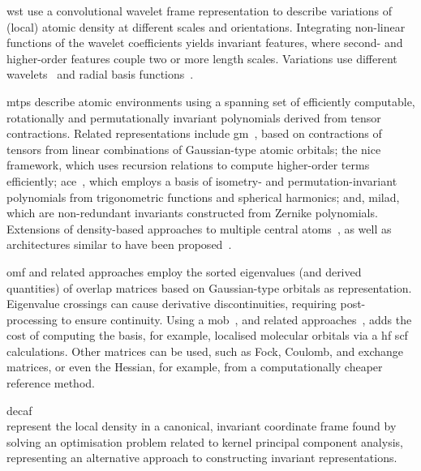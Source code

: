 \Gls{wst} \cite{hmp2017q,hmp2017q,eehm2017q,bsqh2018q,eemt2018q,hhnh2019q,ssqh2020q} use a convolutional wavelet frame representation to describe variations of (local) atomic density at different scales and orientations.
Integrating non-linear functions of the wavelet coefficients yields invariant features, where second- and higher-order features couple two or more length scales.
Variations use different wavelets~\cite{hmp2017q,hmp2017q,eehm2017q,eemt2018q,bsqh2018q,ssqh2020q} and radial basis functions~\cite{eehm2017q,bsqh2018q,ssqh2020q}.

\Glspl{mtp} \cite{s2016q} describe atomic environments using a spanning set of efficiently computable, rotationally and permutationally invariant polynomials derived from tensor contractions.
Related representations include \gls{gm}~\cite{zk2020q}, based on contractions of tensors from linear combinations of Gaussian-type atomic orbitals;
the \gls{nice} framework, \cite{npc2020q} which uses recursion relations to compute higher-order terms efficiently;
\gls{ace}~\cite{d2019q,dboo2022q,d2020Aq}, which employs a basis of isometry- and permutation-invariant polynomials from trigonometric functions and spherical harmonics; and, \gls{milad}, which are non-redundant invariants constructed from Zernike polynomials.
Extensions of density-based approaches to multiple central atoms~\cite{nwc2022q}, as well as architectures similar to \mpnns{} have been proposed~\cite{npfc2022q,bkoc2022q,bbkc2022a}.

\Gls{omf} \cite{sglg2013q,zawg2016q,pdlg2021q} and related approaches \cite{zhj2019q,qwmm2020q} employ the sorted eigenvalues (and derived quantities) of overlap matrices based on Gaussian-type orbitals as representation.
Eigenvalue crossings can cause derivative discontinuities, requiring post-processing \cite{pdlg2021q} to ensure continuity.
Using a \gls{mob}~\cite{wcm2018q,cwcm2019q}, and related approaches~\cite{czwe2020Aq}, adds the cost of computing the basis, for example, localised molecular orbitals via a \gls{hf} \gls{scf} calculations.
Other matrices can be used, such as Fock, Coulomb, and exchange matrices, or even the Hessian, for example, from a computationally cheaper reference method.

\Gls{decaf}~\cite{tzk2018q}\\represent the local density in a canonical, invariant coordinate frame found by solving an optimisation problem related to kernel principal component analysis, representing an alternative approach to constructing invariant representations.


